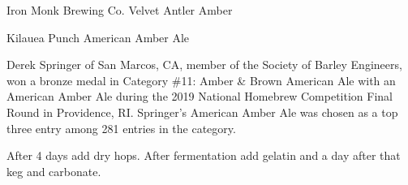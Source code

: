 \begin{recipie}{Iron Monk Brewing Co. Velvet Antler Amber}
\begin{ingredientsblock}
\end{ingredientsblock}

\begin{recipie}{Kilauea Punch American Amber Ale}

\begin{aboutblock}
Derek Springer of San Marcos, CA, member of the Society of Barley Engineers,
won a bronze medal in Category \#11: Amber \& Brown American Ale with an
American Amber Ale during the 2019 National Homebrew Competition Final Round
in Providence, RI. Springer's American Amber Ale was chosen as a top three
entry among 281 entries in the category.
\end{aboutblock}


\begin{methodandtiming}
 
\begin{mashsteps}
\end{mashsteps}

\begin{fermentationsteps}
\end{fermentationsteps}

\begin{directions}
After 4 days add dry hops. After fermentation add gelatin and a day after that
keg and carbonate.
\end{directions}

\end{methodandtiming}

\pagebreak

\begin{ingredientsblock}

\begin{malts}
\end{malts}

\begin{hops}
\end{hops}


\end{ingredientsblock}
\end{recipie}
\end{recipie}
